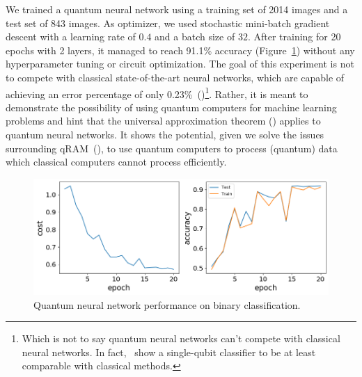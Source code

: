 \documentclass[a4paper,10pt]{article}
\begin{document}
We trained a quantum neural network using a training set of 2014 images and a test set of 843 images.
As optimizer, we used stochastic mini-batch gradient descent with a learning rate of $0.4$ and a batch size of $32$.
After training for 20 epochs with 2 layers, it managed to reach 91.1\% accuracy (Figure~\ref{fig:bdc-performance}) without any hyperparameter tuning or circuit optimization.
The goal of this experiment is not to compete with classical state-of-the-art neural networks, which are capable of achieving an error percentage of only 0.23\%~(\cite{cirecsan2012multi})\footnote{Which is not to say quantum neural networks can't compete with classical neural networks. In fact,~\cite{perez2019data} show a single-qubit classifier to be at least comparable with classical methods.}.
Rather, it is meant to demonstrate the possibility of using quantum computers for machine learning problems and hint that the universal approximation theorem (\cite{csaji2001approximation}) applies to quantum neural networks.
It shows the potential, given we solve the issues surrounding qRAM~(\cite{aaronson2015read}), to use quantum computers to process (quantum) data which classical computers cannot process efficiently.
\begin{figure}[ht]
	\centering
	\includegraphics[width=.9\linewidth]{figures/downsampled_qnn.png}
	\caption{Quantum neural network performance on binary classification.}
	\label{fig:bdc-performance}
\end{figure}
\end{document}
